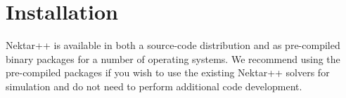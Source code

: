 \chapter{Installation}

Nektar++ is available in both a source-code distribution and as
pre-compiled binary packages for a number of operating systems. We recommend
using the pre-compiled packages if you wish to use the existing Nektar++
solvers for simulation and do not need to perform additional code development.






